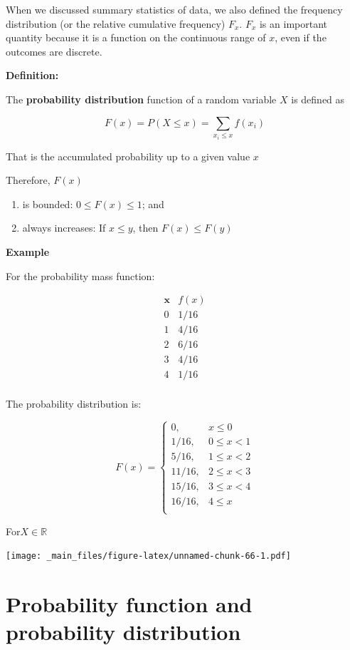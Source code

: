 \documentclass[
]{book}
\providecommand{\tightlist}{%
  \setlength{\itemsep}{0pt}\setlength{\parskip}{0pt}}
\begin{document}
When we discussed summary statistics of data, we also defined the frequency distribution (or the relative cumulative frequency) \(F_x\). \(F_x\) is an important quantity because it is a function on the continuous range of \(x\), even if the outcomes are discrete.

\textbf{Definition:}

The \textbf{probability distribution} function of a random variable \(X\) is defined as

\[F(x)=P(X\leq x)=\sum_{x_i\leq x} f(x_i) \]

That is the accumulated probability up to a given value \(x\)

Therefore, \(F(x)\)

\begin{enumerate}
\def\labelenumi{\arabic{enumi})}
\tightlist
\item
  is bounded: \(0\leq F(x) \leq 1\); and
\item
  always increases: If \(x \leq y\), then \(F(x) \leq F(y)\)
\end{enumerate}

\textbf{Example}

For the probability mass function:

\[
\begin{array}{cc}
\mathbf{x} & f(x) \\
0 & 1/16 \\
1 & 4/16 \\
2 & 6/16 \\
3 & 4/16 \\
4 & 1/16 \\
\end{array}
\]

The probability distribution is:

\[
    F(x)=
\begin{cases}
    0, & x \leq 0\\
    1/16,& 0 \leq x < 1\\
    5/16,& 1\leq x < 2\\
    11/16,& 2\leq x < 3\\
    15/16,& 3 \leq x < 4\\
    16/16,&   4 \leq x\\
\end{cases}
\]

For\(X \in \mathbb{R}\)

\texttt{[image: \_main\_files/figure-latex/unnamed-chunk-66-1.pdf]}

\hypertarget{probability-function-and-probability-distribution}{%
\section{Probability function and probability distribution}\label{probability-function-and-probability-distribution}}
\end{document}
